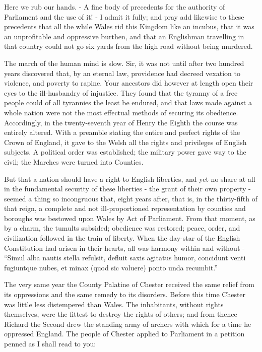 Here we rub our hands. - A fine body of precedents for the authority of Parliament and the use of it! - I admit it fully; and pray add likewise to these precedents that all the while Wales rid this Kingdom like an incubus, that it was an unprofitable and oppressive burthen, and that an Englishman travelling in that country could not go six yards from the high road without being murdered.\par

The march of the human mind is slow. Sir, it was not until after two hundred years discovered that, by an eternal law, providence had decreed vexation to violence, and poverty to rapine. Your ancestors did however at length open their eyes to the ill-husbandry of injustice. They found that the tyranny of a free people could of all tyrannies the least be endured, and that laws made against a whole nation were not the most effectual methods of securing its obedience. Accordingly, in the twenty-seventh year of Henry the Eighth the course was entirely altered. With a preamble stating the entire and perfect rights of the Crown of England, it gave to the Welsh all the rights and privileges of English subjects. A political order was established; the military power gave way to the civil; the Marches were turned into Counties.\par

But that a nation should have a right to English liberties, and yet no share at all in the fundamental security of these liberties - the grant of their own property - seemed a thing so incongruous that, eight years after, that is, in the thirty-fifth of that reign, a complete and not ill-proportioned representation by counties and boroughs was bestowed upon Wales by Act of Parliament. From that moment, as by a charm, the tumults subsided; obedience was restored; peace, order, and civilization followed in the train of liberty. When the day-star of the English Constitution had arisen in their hearts, all was harmony within and without - “Simul alba nautis stella refulsit, defluit saxis agitatus humor, concidunt venti fugiuntque nubes, et minax (quod sic voluere) ponto unda recumbit.”\par

The very same year the County Palatine of Chester received the same relief from its oppressions and the same remedy to its disorders. Before this time Chester was little less distempered than Wales. The inhabitants, without rights themselves, were the fittest to destroy the rights of others; and from thence Richard the Second drew the standing army of archers with which for a time he oppressed England. The people of Chester applied to Parliament in a petition penned as I shall read to you:\par


